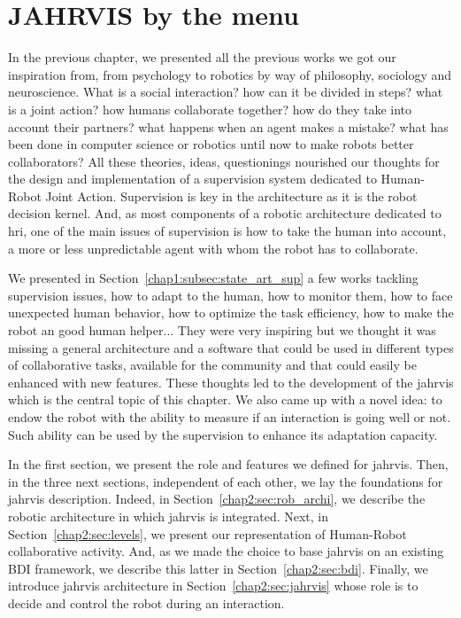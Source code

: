 \documentclass[a4paper,11pt,twoside]{StyleThese}
\begin{document}
	\setcounter{chapter}{4} %
	\dominitoc
	\faketableofcontents
	\fi

\chapter{JAHRVIS by the menu}
\label{chapter:chap2}
\minitoc


In the previous chapter, we presented all the previous works we got our inspiration from, from psychology to robotics by way of philosophy, sociology and neuroscience. What is a social interaction? how can it be divided in steps? what is a joint action? how humans collaborate together? how do they take into account their partners? what happens when an agent makes a mistake? what has been done in computer science or robotics until now to make robots better collaborators? All these theories, ideas, questionings nourished our thoughts for the design and implementation of a supervision system dedicated to Human-Robot Joint Action. Supervision is key in the architecture as it is the robot decision kernel. And, as most components of a robotic architecture dedicated to \acrshort{hri}, one of the main issues of supervision is how to take the human into account, a more or less unpredictable agent with whom the robot has to collaborate. 

We presented in Section~\ref{chap1:subsec:state_art_sup} a few works tackling supervision issues, \ie how to adapt to the human, how to monitor them, how to face unexpected human behavior, how to optimize the task efficiency, how to make the robot an good human helper... They were very inspiring but we thought it was missing a general architecture and a software that could be used in different types of collaborative tasks, available for the community and that could easily be enhanced with new features. These thoughts led to the development of the \acrfull{jahrvis} which is the central topic of this chapter. We also came up with a novel idea: to endow the robot with the ability to measure if an interaction is going well or not. Such ability can be used by the supervision to enhance its adaptation capacity.

In the first section, we present the role and features we defined for \acrshort{jahrvis}. Then, in the three next sections, independent of each other, we lay the foundations for \acrshort{jahrvis} description. Indeed, in Section~\ref{chap2:sec:rob_archi}, we describe the robotic architecture in which \acrshort{jahrvis} is integrated. Next, in Section~\ref{chap2:sec:levels}, we present our representation of Human-Robot collaborative activity. And, as we made the choice to base \acrshort{jahrvis} on an existing BDI framework, we describe this latter in Section~\ref{chap2:sec:bdi}. Finally, we introduce \acrshort{jahrvis} architecture in Section~\ref{chap2:sec:jahrvis} whose role is to decide and control the robot during an interaction.
\end{document}
